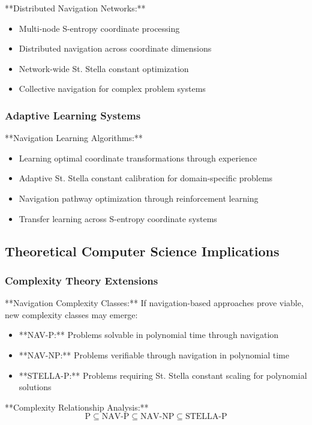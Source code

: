 \documentclass[11pt]{article}
\begin{document}
**Distributed Navigation Networks:**
\begin{itemize}
\item Multi-node S-entropy coordinate processing
\item Distributed navigation across coordinate dimensions
\item Network-wide St. Stella constant optimization
\item Collective navigation for complex problem systems
\end{itemize}

\subsubsection{Adaptive Learning Systems}

**Navigation Learning Algorithms:**
\begin{itemize}
\item Learning optimal coordinate transformations through experience
\item Adaptive St. Stella constant calibration for domain-specific problems
\item Navigation pathway optimization through reinforcement learning
\item Transfer learning across S-entropy coordinate systems
\end{itemize}

\subsection{Theoretical Computer Science Implications}

\subsubsection{Complexity Theory Extensions}

**Navigation Complexity Classes:**
If navigation-based approaches prove viable, new complexity classes may emerge:
\begin{itemize}
\item **NAV-P:** Problems solvable in polynomial time through navigation
\item **NAV-NP:** Problems verifiable through navigation in polynomial time
\item **STELLA-P:** Problems requiring St. Stella constant scaling for polynomial solutions
\end{itemize}

**Complexity Relationship Analysis:**
\begin{equation}
\text{P} \subseteq \text{NAV-P} \subseteq \text{NAV-NP} \subseteq \text{STELLA-P}
\label{eq:complexity_relationships}
\end{equation}
\end{document}
